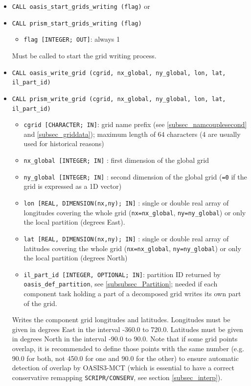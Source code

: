 \begin{itemize}

\item {\tt CALL oasis\_start\_grids\_writing (flag)} or
\item {\tt CALL prism\_start\_grids\_writing (flag)}
  \begin{itemize}
  \item {\tt flag [INTEGER; OUT]}: always 1  
  \end{itemize}
 Must be called to start the grid writing process.  
  \vspace{0.2cm}
\item {\tt CALL oasis\_write\_grid (cgrid, nx\_global, ny\_global, lon, lat, il\_part\_id)}
\item {\tt CALL prism\_write\_grid (cgrid, nx\_global, ny\_global, lon, lat, il\_part\_id)}
        
  \begin{itemize}
  \item {\tt cgrid [CHARACTER; IN]}: grid name prefix (see
    \ref{subsec_namcouplesecond} and \ref{subsec_griddata}); maximum length of 64 characters (4 are usually used for historical reasons)
  \item {\tt nx\_global [INTEGER; IN]} : first dimension of the global grid 
  \item {\tt ny\_global [INTEGER; IN]} : second dimension of the global grid ({\tt =0} if the grid is expressed as a 1D vector) 
  \item {\tt lon [REAL, DIMENSION(nx,ny); IN]} : single or double real array of longitudes covering the whole grid ({\tt nx=nx\_global}, {\tt ny=ny\_global}) or only the local partition (degrees East).
  \item {\tt lat [REAL, DIMENSION(nx,ny); IN]} : single or double real array of latitudes covering the whole grid ({\tt nx=nx\_global}, {\tt ny=ny\_global}) or only the local partition (degrees North)
\item  {\tt il\_part\_id [INTEGER, OPTIONAL; IN]}: partition ID returned by {\tt oasis\_def\_partition}, see \ref{subsubsec_Partition}; needed if each component task holding a part of a decomposed grid writes its own part of the grid.
  \end{itemize}

  Writes the component grid longitudes and latitudes. Longitudes must be
  given in degrees East in the interval -360.0 to 720.0. Latitudes
  must be given in degrees North in the interval -90.0 to 90.0. Note
  that if some grid points overlap, it is recommended to define those
  points with the same number (e.g. 90.0 for both, not 450.0 for one
  and 90.0 for the other) to ensure automatic detection of overlap by
  OASIS3-MCT (which is essential to have a correct conservative
  remapping \texttt{SCRIPR/CONSERV}, see section \ref{subsec_interp}).


\end{itemize}
